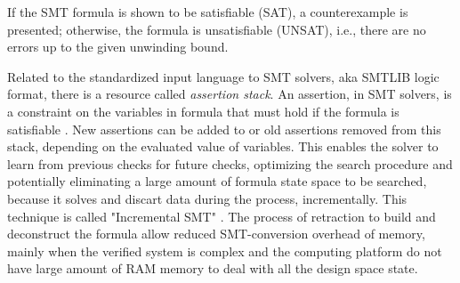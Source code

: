 \documentclass[journal]{IEEEtran}
\begin{document}
%
If the SMT formula is shown to be satisfiable (SAT), a counterexample is presented; otherwise, the formula is unsatisfiable (UNSAT), i.e., there are no errors up to the given unwinding bound. 

Related to the standardized input language to SMT solvers, aka SMTLIB logic format, there is a resource called \textit{assertion stack}. An assertion, in SMT solvers, is a constraint on the variables in formula that must hold if the formula is satisfiable \cite{Morse2015}. New assertions can be added to or old assertions removed from this stack, depending on the evaluated value of variables. This enables the solver to learn from previous checks for future checks, optimizing the search procedure and potentially eliminating a large amount of formula state space to be searched, because it solves and discart data during the process, incrementally. This technique is called "Incremental SMT" \cite{Morse2015}. The process of retraction to build and deconstruct the formula allow reduced SMT-conversion overhead of memory, mainly when the verified system is complex and the computing platform do not have large amount of RAM memory to deal with all the design space state.
%
%
 
\end{document}
